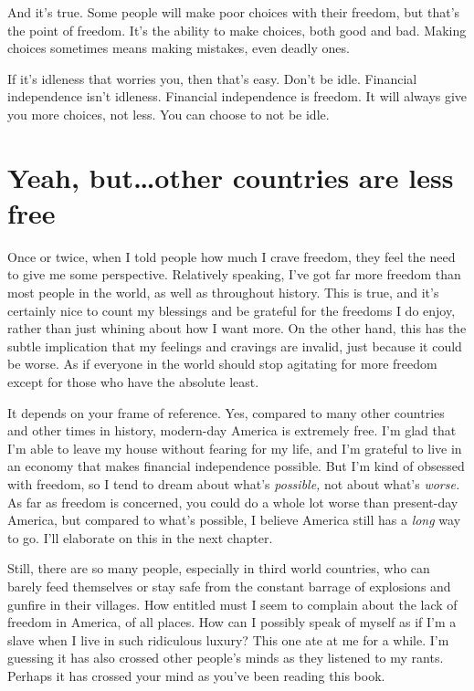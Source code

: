 And it's true. Some people will make poor choices with their freedom, but that's the point of freedom. It's the ability to make choices, both good and bad. Making choices sometimes means making mistakes, even deadly ones.

If it's idleness that worries you, then that's easy. Don't be idle. Financial independence isn't idleness. Financial independence is freedom. It will always give you more choices, not less. You can choose to not be idle.

\section{Yeah, but\ldots other countries are less free}
Once or twice, when I told people how much I crave freedom, they feel the need to give me some perspective. Relatively speaking, I've got far more freedom than most people in the world, as well as throughout history. This is true, and it's certainly nice to count my blessings and be grateful for the freedoms I do enjoy, rather than just whining about how I want more. On the other hand, this has the subtle implication that my feelings and cravings are invalid, just because it could be worse. As if everyone in the world should stop agitating for more freedom except for those who have the absolute least.

It depends on your frame of reference. Yes, compared to many other countries and other times in history, modern-day America is extremely free. I'm glad that I'm able to leave my house without fearing for my life, and I'm grateful to live in an economy that makes financial independence possible. But I'm kind of obsessed with freedom, so I tend to dream about what's \emph{possible,} not about what's \emph{worse.} As far as freedom is concerned, you could do a whole lot worse than present-day America, but compared to what's possible, I believe America still has a \emph{long} way to go. I'll elaborate on this in the next chapter.

Still, there are so many people, especially in third world countries, who can barely feed themselves or stay safe from the constant barrage of explosions and gunfire in their villages. How entitled must I seem to complain about the lack of freedom in America, of all places. How can I possibly speak of myself as if I'm a slave when I live in such ridiculous luxury? This one ate at me for a while. I'm guessing it has also crossed other people's minds as they listened to my rants. Perhaps it has crossed your mind as you've been reading this book.

